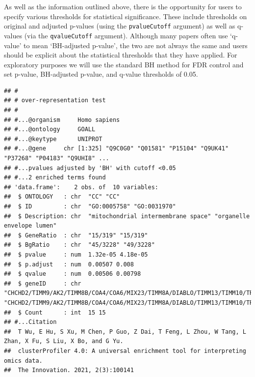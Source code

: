 \documentclass[9pt,a4paper,]{extarticle}
\newenvironment{Shaded}{\begin{snugshade}}{\end{snugshade}}
\newcommand{\AttributeTok}[1]{\textcolor[rgb]{0.13,0.29,0.53}{#1}}
\newcommand{\ConstantTok}[1]{\textcolor[rgb]{0.56,0.35,0.01}{#1}}
\newcommand{\DocumentationTok}[1]{\textcolor[rgb]{0.56,0.35,0.01}{\textbf{\textit{#1}}}}
\newcommand{\FloatTok}[1]{\textcolor[rgb]{0.00,0.00,0.81}{#1}}
\newcommand{\FunctionTok}[1]{\textcolor[rgb]{0.13,0.29,0.53}{\textbf{#1}}}
\newcommand{\NormalTok}[1]{#1}
\newcommand{\OtherTok}[1]{\textcolor[rgb]{0.56,0.35,0.01}{#1}}
\newcommand{\SpecialCharTok}[1]{\textcolor[rgb]{0.81,0.36,0.00}{\textbf{#1}}}
\newcommand{\StringTok}[1]{\textcolor[rgb]{0.31,0.60,0.02}{#1}}
\begin{document}
As well as the information outlined above, there is the opportunity for users to
specify various thresholds for statistical significance. These include
thresholds on original and adjusted p-values (using the \texttt{pvalueCutoff} argument)
as well as q-values (via the \texttt{qvalueCutoff} argument). Although many papers
often use `q- value' to mean `BH-adjusted p-value', the two are not always the
same and users should be explicit about the statistical thresholds that they
have applied. For exploratory purposes we will use the standard BH method for
FDR control and set p-value, BH-adjusted p-value, and q-value thresholds of
0.05.

\begin{Shaded}
\end{Shaded}

\begin{verbatim}
## #
## # over-representation test
## #
## #...@organism     Homo sapiens 
## #...@ontology     GOALL 
## #...@keytype      UNIPROT 
## #...@gene     chr [1:325] "Q9C0G0" "Q01581" "P15104" "Q9UK41" "P37268" "P04183" "Q9UHI8" ...
## #...pvalues adjusted by 'BH' with cutoff <0.05 
## #...2 enriched terms found
## 'data.frame':    2 obs. of  10 variables:
##  $ ONTOLOGY   : chr  "CC" "CC"
##  $ ID         : chr  "GO:0005758" "GO:0031970"
##  $ Description: chr  "mitochondrial intermembrane space" "organelle envelope lumen"
##  $ GeneRatio  : chr  "15/319" "15/319"
##  $ BgRatio    : chr  "45/3228" "49/3228"
##  $ pvalue     : num  1.32e-05 4.18e-05
##  $ p.adjust   : num  0.00507 0.008
##  $ qvalue     : num  0.00506 0.00798
##  $ geneID     : chr  "CHCHD2/TIMM9/AK2/TIMM8B/COA4/COA6/MIX23/TIMM8A/DIABLO/TIMM13/TIMM10/TRIAP1/CYCS/COX17/CAT" "CHCHD2/TIMM9/AK2/TIMM8B/COA4/COA6/MIX23/TIMM8A/DIABLO/TIMM13/TIMM10/TRIAP1/CYCS/COX17/CAT"
##  $ Count      : int  15 15
## #...Citation
##  T Wu, E Hu, S Xu, M Chen, P Guo, Z Dai, T Feng, L Zhou, W Tang, L Zhan, X Fu, S Liu, X Bo, and G Yu.
##  clusterProfiler 4.0: A universal enrichment tool for interpreting omics data.
##  The Innovation. 2021, 2(3):100141
\end{verbatim}
\end{document}
